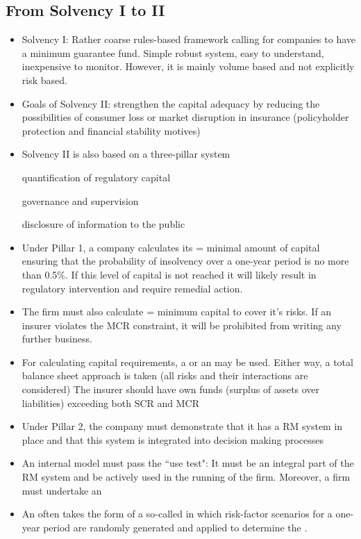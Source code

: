 \subsection*{From Solvency I to II}
\begin{itemize}[leftmargin=*]
    \item Solvency I: Rather coarse rules-based framework calling for companies to have a minimum guarantee fund. Simple robust system, easy to understand, inexpensive to monitor. However, it is mainly volume based and not explicitly risk based.
    \item Goals of Solvency II: strengthen the capital adequacy by reducing the possibilities of consumer
loss or market disruption in insurance (policyholder protection and financial stability motives)
    \item Solvency II is also based on a three-pillar system
    
 quantification of regulatory capital

 governance and supervision

 disclosure of information to the public

    \item Under Pillar 1, a company calculates its  = minimal
amount of capital ensuring that the probability of insolvency over a one-year period is no more
than 0.5\%. If this level of capital is not reached it will likely result in regulatory intervention
and require remedial action.
    \item The firm must also calculate  = minimum capital to cover
it’s risks. If an insurer violates the MCR constraint, it will be prohibited from writing any further business.
    \item For calculating capital requirements, a  or an  may be used. Either way, a total balance sheet approach is taken (all risks and their interactions are considered)
The insurer should have own funds (surplus of assets over liabilities) exceeding both SCR and MCR
    \item Under Pillar 2, the company must demonstrate that it has a RM system in place and that this system is integrated into decision making processes
    \item An internal model must pass the “use test": It must be an integral part of the RM system and be actively used in the running of the firm. Moreover, a firm must undertake an 
    \item An  often takes the form of a so-called  in which risk-factor scenarios for a one-year period are randomly generated and applied to determine the .
    
\end{itemize}



